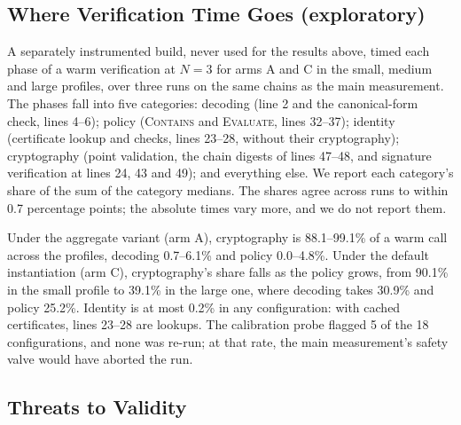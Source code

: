 \documentclass[11pt,a4paper]{article}
\begin{document}
\begin{table}[t]
\centering
\small
\caption{\tabcapPositioning}
\label{tab:positioning}
\end{table}

\subsection{Where Verification Time Goes (exploratory)}
\label{sec:eval-phases}

A separately instrumented build, never used for the results above,
timed each phase of a warm verification at $N = 3$ for arms A and C in
the small, medium and large profiles, over three runs on the same chains
as the main measurement. The phases fall into five categories:
decoding (line 2 and the canonical-form check, lines 4--6); policy
(\textsc{Contains} and \textsc{Evaluate}, lines 32--37); identity
(certificate lookup and checks, lines 23--28, without their
cryptography); cryptography (point validation, the chain digests of
lines 47--48, and signature verification at lines 24, 43 and 49); and
everything else. We report each category's share of the sum of the
category medians. The shares agree across runs to within 0.7 percentage
points; the absolute times vary more, and we do not report them.

Under the aggregate variant (arm A), cryptography is 88.1--99.1\% of a
warm call across the profiles, decoding 0.7--6.1\% and policy
0.0--4.8\%. Under the default instantiation (arm C), cryptography's
share falls as the policy grows, from 90.1\% in the small profile to
39.1\% in the large one, where decoding takes 30.9\% and policy
25.2\%. Identity is at most 0.2\% in any configuration: with cached
certificates, lines 23--28 are lookups. The calibration probe flagged 5
of the 18 configurations, and none was re-run; at that rate, the main
measurement's safety valve would have aborted the run.

\subsection{Threats to Validity}
\label{sec:eval-threats}
\end{document}
